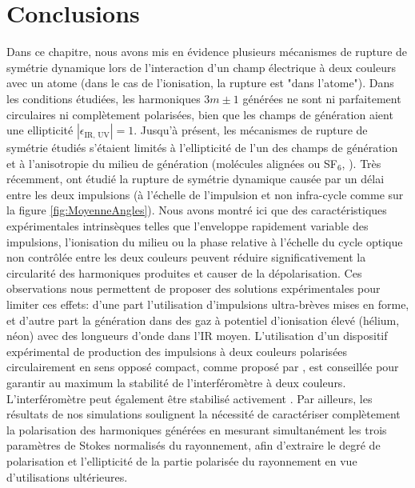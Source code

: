 \section*{Conclusions}
Dans ce chapitre, nous avons mis en évidence plusieurs mécanismes de rupture de symétrie dynamique lors de l'interaction d'un champ électrique à deux couleurs avec un atome (dans le cas de l'ionisation, la rupture est "dans l'atome"). Dans les conditions étudiées, les harmoniques $3m \pm 1$ générées ne sont ni parfaitement circulaires ni complètement polarisées, bien que les champs de génération aient une ellipticité $|\epsilon_{\text{IR, UV}}| = 1$. Jusqu'à présent, les mécanismes de rupture de symétrie étudiés s'étaient limités à l'ellipticité de l'un des champs de génération   et à l'anisotropie du milieu de génération (molécules alignées ou SF$_6$, ). Très récemment,  ont étudié la rupture de symétrie dynamique causée par un délai entre les deux impulsions (à l'échelle de l'impulsion et non infra-cycle comme sur la figure \ref{fig:MoyenneAngles}). Nous avons montré ici que des caractéristiques expérimentales intrinsèques telles que l'enveloppe rapidement variable des impulsions, l'ionisation du milieu ou la phase relative à l'échelle du cycle optique non contrôlée entre les deux couleurs peuvent réduire significativement la circularité des harmoniques produites et causer de la dépolarisation. Ces observations nous permettent de proposer des solutions expérimentales pour limiter ces effets: d'une part l'utilisation d'impulsions ultra-brèves mises en forme, et d'autre part la génération dans des gaz à potentiel d'ionisation élevé (hélium, néon) avec des longueurs d'onde dans l'IR moyen. L'utilisation d'un dispositif expérimental de production des impulsions à deux couleurs polarisées circulairement en sens opposé compact, comme proposé par , est conseillée pour garantir au maximum la stabilité de l'interféromètre à deux couleurs. L'interféromètre peut également être stabilisé activement . Par ailleurs, les résultats de nos simulations soulignent la nécessité de caractériser complètement la polarisation des harmoniques générées en mesurant simultanément les trois paramètres de Stokes normalisés du rayonnement, afin d'extraire le degré de polarisation et l'ellipticité de la partie polarisée du rayonnement en vue d'utilisations ultérieures.






